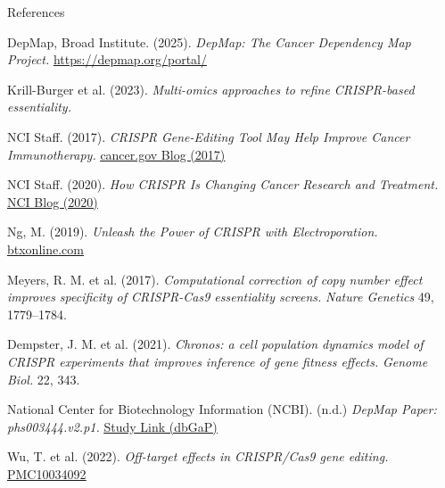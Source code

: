 \documentclass[10pt]{beamer}
\let\oldhref\href
\renewcommand{\href}[2]{\oldhref{#1}{\uline{#2}}}
\begin{document}
\begin{frame}[allowframebreaks]{References}
  \footnotesize
  \setlength{\parskip}{0pt}
  \begin{thebibliography}{99}


    DepMap, Broad Institute. (2025).
    \emph{DepMap: The Cancer Dependency Map Project.} \href{https://depmap.org/portal/}{https://depmap.org/portal/}

    Krill-Burger et al. (2023).
    \emph{Multi-omics approaches to refine CRISPR-based essentiality.}

    NCI Staff. (2017).
    \emph{CRISPR Gene-Editing Tool May Help Improve Cancer Immunotherapy.} \href{https://www.cancer.gov/news-events/cancer-currents-blog/2017/crispr-immunotherapy}{cancer.gov Blog (2017)}


    NCI Staff. (2020).
    \emph{How CRISPR Is Changing Cancer Research and Treatment.} \href{https://www.cancer.gov/news-events/cancer-currents-blog/2020/crispr-cancer-research-treatment}{NCI Blog (2020)}


    Ng, M. (2019).
    \emph{Unleash the Power of CRISPR with Electroporation.} \href{https://www.btxonline.com/blog/unleash-the-power-of-crispr-with-electroporation/}{btxonline.com}


    Meyers, R. M. et al. (2017).
    \emph{Computational correction of copy number effect improves specificity of CRISPR-Cas9 essentiality screens.} \emph{Nature Genetics} 49, 1779–1784.


    Dempster, J. M. et al. (2021).
    \emph{Chronos: a cell population dynamics model of CRISPR experiments that improves inference of gene fitness effects.} \emph{Genome Biol.} 22, 343.


    National Center for Biotechnology Information (NCBI). (n.d.)
    \emph{DepMap Paper: phs003444.v2.p1.} \href{https://www.ncbi.nlm.nih.gov/projects/gap/cgi-bin/study.cgi?study_id=phs003444.v2.p1}{Study Link (dbGaP)}



    Wu, T. et al. (2022).
    \emph{Off-target effects in CRISPR/Cas9 gene editing.} \href{https://www.ncbi.nlm.nih.gov/pmc/articles/PMC10034092/}{PMC10034092}



\end{thebibliography}
\end{frame}
\end{document}
